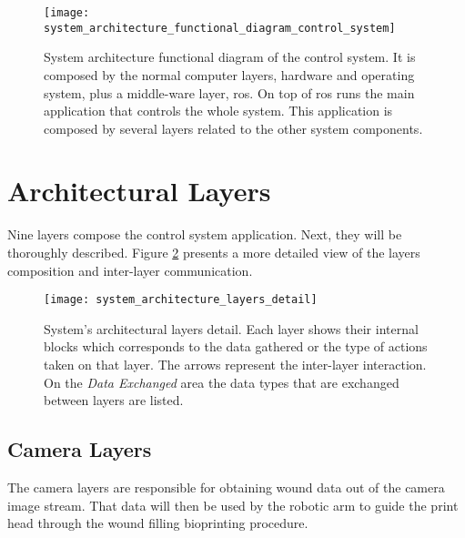 \begin{figure}[htbp]
	\centering
	\texttt{[image: system\_architecture\_functional\_diagram\_control\_system]}
	\caption[System architecture functional diagram of the control system.]{System architecture functional diagram of the control system. It is composed by the normal computer layers, hardware and operating system, plus a middle-ware layer, \gls{ros}. On top of \gls{ros} runs the main application that controls the whole system. This application is composed by several layers related to the other system components.}
	\label{fig:system_architecture_functional_diagram_control_system}
\end{figure}



\section{Architectural Layers}
\label{sec:system_architectural_layers}

Nine layers compose the control system application. Next, they will be thoroughly described. Figure \ref{fig:system_architecture_layers_detail} presents a more detailed view of the layers composition and inter-layer communication.

\begin{figure}[htbp]
	\centering
	\texttt{[image: system\_architecture\_layers\_detail]}
	\caption[System's architectural layers detail.]{System's architectural layers detail. Each layer shows their internal blocks which corresponds to the data gathered or the type of actions taken on that layer. The arrows represent the inter-layer interaction. On the \textit{Data Exchanged} area the data types that are exchanged between layers are listed. }
	\label{fig:system_architecture_layers_detail}
\end{figure}

\subsection{Camera Layers}
\label{subsec:system_architectural_camera_layers}

The camera layers are responsible for obtaining wound data out of the camera image stream. That data will then be used by the robotic arm to guide the print head through the wound filling bioprinting procedure.


